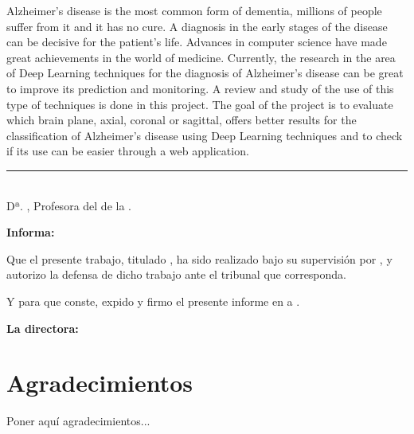 Alzheimer's disease is the most common form of dementia, millions of people suffer from it and it has no cure.
A diagnosis in the early stages of the disease can be decisive for the patient's life.
Advances in computer science have made great achievements in the world of medicine.
Currently, the research in the area of Deep Learning techniques for the diagnosis of Alzheimer's disease can be great
to improve its prediction and monitoring.
A review and study of the use of this type of techniques is done in this project.
The goal of the project is to evaluate which brain plane, axial, coronal or sagittal, offers better results for the
classification of Alzheimer's disease using Deep Learning techniques and to check if its use can be easier through a
web application.

%
%
%
%
%
%


\cleardoublepage
\thispagestyle{empty}

\noindent\rule[-1ex]{\textwidth}{2pt}\\[4.5ex]

Dª. \textbf{\myProf}, Profesora del \myDepartment de la \myUni.

\vspace{0.5cm}

\textbf{Informa:}

\vspace{0.5cm}

Que el presente trabajo, titulado \textit{\textbf{\myTitle}},
ha sido realizado bajo su supervisión por \textbf{\myName}, y autorizo la defensa de dicho trabajo ante el tribunal
que corresponda.

\vspace{0.5cm}

Y para que conste, expido y firmo el presente informe en \myLocation a \myTime.

\vspace{1cm}

\textbf{La directora:}

\vspace{5cm}

\noindent \textbf{\myProf}

\chapter*{Agradecimientos}
\thispagestyle{empty}

       \vspace{1cm}


Poner aquí agradecimientos...

